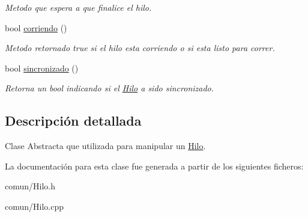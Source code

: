 \begin{DoxyCompactItemize}
\begin{DoxyCompactList}\small\item\em \-Metodo que espera a que finalice el hilo. \end{DoxyCompactList}\item 
\hypertarget{classHilo_a8aee7c83c953aebc358b9628eb80dd91}{bool \hyperlink{classHilo_a8aee7c83c953aebc358b9628eb80dd91}{corriendo} ()}\label{classHilo_a8aee7c83c953aebc358b9628eb80dd91}

\begin{DoxyCompactList}\small\item\em \-Metodo retornado true si el hilo esta corriendo o si esta listo para correr. \end{DoxyCompactList}\item 
\hypertarget{classHilo_a246e81bf78d664fabf0c4fe96feab550}{bool \hyperlink{classHilo_a246e81bf78d664fabf0c4fe96feab550}{sincronizado} ()}\label{classHilo_a246e81bf78d664fabf0c4fe96feab550}

\begin{DoxyCompactList}\small\item\em \-Retorna un bool indicando si el \hyperlink{classHilo}{\-Hilo} a sido sincronizado. \end{DoxyCompactList}\end{DoxyCompactItemize}


\subsection{\-Descripción detallada}
\-Clase \-Abstracta que utilizada para manipular un \hyperlink{classHilo}{\-Hilo}. 

\-La documentación para esta clase fue generada a partir de los siguientes ficheros\-:\begin{DoxyCompactItemize}
\item 
comun/\-Hilo.\-h\item 
comun/\-Hilo.\-cpp\end{DoxyCompactItemize}
